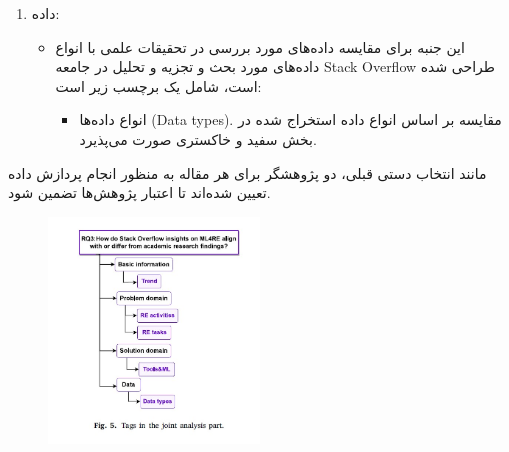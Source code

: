 \documentclass[a4paper,10pt]{article}
\begin{document}
\begin{enumerate}
                    \item داده:
                    \begin{itemize}
                        \item این جنبه برای مقایسه داده‌های مورد بررسی در تحقیقات علمی با انواع داده‌های مورد بحث و تجزیه و تحلیل در جامعه Stack Overflow طراحی شده است، شامل یک برچسب زیر است:
                        \begin{itemize}
                            \item انواع داده‌ها (Data types). مقایسه بر اساس انواع داده استخراج شده در بخش سفید و خاکستری صورت می‌پذیرد.
                        \end{itemize}
                    \end{itemize}
                \end{enumerate}
                

                مانند انتخاب دستی قبلی، دو پژوهشگر برای هر مقاله به منظور انجام پردازش داده تعیین شده‌اند تا اعتبار پژوهش‌ها تضمین شود.

                \begin{figure}
                    \centering
                    \includegraphics[width=0.5\textwidth]{Image/fig-5.jpg}
                \end{figure}
            

                    
\end{document}
